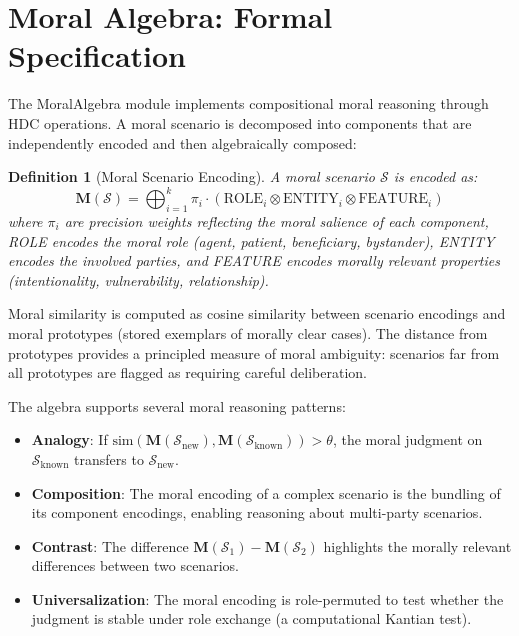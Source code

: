 \documentclass[12pt]{book}
\newtheorem{definition}[theorem]{Definition}
\newcommand{\bind}{\otimes}
\begin{document}
\section{Moral Algebra: Formal Specification}

The MoralAlgebra module implements compositional moral reasoning through HDC operations. A moral scenario is decomposed into components that are independently encoded and then algebraically composed:

\begin{definition}[Moral Scenario Encoding]\label{def:moral-encoding}
A moral scenario $\mathcal{S}$ is encoded as:
\begin{equation}
\mathbf{M}(\mathcal{S}) = \bigoplus_{i=1}^{k} \pi_i \cdot (\text{ROLE}_i \bind \text{ENTITY}_i \bind \text{FEATURE}_i)
\end{equation}
where $\pi_i$ are precision weights reflecting the moral salience of each component, ROLE encodes the moral role (agent, patient, beneficiary, bystander), ENTITY encodes the involved parties, and FEATURE encodes morally relevant properties (intentionality, vulnerability, relationship).
\end{definition}

Moral similarity is computed as cosine similarity between scenario encodings and moral prototypes (stored exemplars of morally clear cases). The distance from prototypes provides a principled measure of moral ambiguity: scenarios far from all prototypes are flagged as requiring careful deliberation.

The algebra supports several moral reasoning patterns:
\begin{itemize}
  \item \textbf{Analogy}: If $\text{sim}(\mathbf{M}(\mathcal{S}_{\text{new}}), \mathbf{M}(\mathcal{S}_{\text{known}})) > \theta$, the moral judgment on $\mathcal{S}_{\text{known}}$ transfers to $\mathcal{S}_{\text{new}}$.
  \item \textbf{Composition}: The moral encoding of a complex scenario is the bundling of its component encodings, enabling reasoning about multi-party scenarios.
  \item \textbf{Contrast}: The difference $\mathbf{M}(\mathcal{S}_1) - \mathbf{M}(\mathcal{S}_2)$ highlights the morally relevant differences between two scenarios.
  \item \textbf{Universalization}: The moral encoding is role-permuted to test whether the judgment is stable under role exchange (a computational Kantian test).
\end{itemize}
\end{document}
